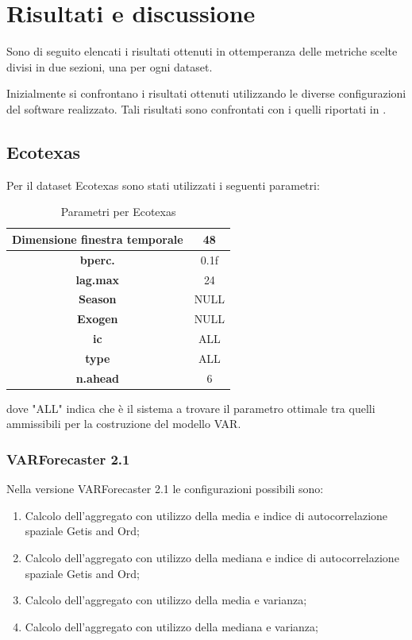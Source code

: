 \documentclass[12pt,a4paper,oneside,openright]{book}
\begin{document}
\section{Risultati e discussione}
Sono di seguito elencati i risultati ottenuti in ottemperanza delle metriche scelte divisi in due sezioni, una per ogni dataset. 

Inizialmente si confrontano i risultati ottenuti utilizzando le diverse configurazioni del software realizzato. Tali risultati sono confrontati con i quelli riportati in \cite{donato}.
\subsection{Ecotexas}
Per il dataset Ecotexas sono stati utilizzati i seguenti parametri:

\begin{center}
\begin{table}[H]
\centering
\begin{tabular}{|c|c|}
\hline
\textbf{Dimensione finestra temporale} & 48 \\
\hline
\textbf{bperc.} & 0.1f \\
\hline
\textbf{lag.max} & 24 \\
\hline
\textbf{Season} & NULL \\
\hline
\textbf{Exogen} & NULL \\
\hline
\textbf{ic} & ALL \\
\hline
\textbf{type} & ALL \\
\hline
\textbf{n.ahead} & 6 \\
\hline
\end{tabular}
\caption{Parametri per Ecotexas}
\end{table}
\end{center}
dove "ALL" indica che è il sistema a trovare il parametro ottimale tra quelli ammissibili per la costruzione del modello VAR.

\medskip

\subsubsection{VARForecaster 2.1}

Nella versione VARForecaster 2.1 le configurazioni possibili sono:
\begin{enumerate}
\item Calcolo dell'aggregato con utilizzo della media e indice di autocorrelazione spaziale Getis and Ord;
\item Calcolo dell'aggregato con utilizzo della mediana e indice di autocorrelazione spaziale Getis and Ord;
\item Calcolo dell'aggregato con utilizzo della media e varianza;
\item Calcolo dell'aggregato con utilizzo della mediana e varianza;
\end{enumerate}
\end{document}
